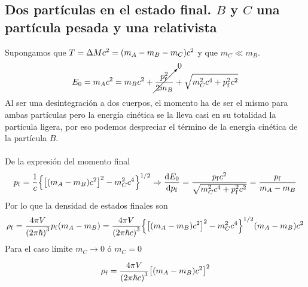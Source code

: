\subsection{Dos partículas en el estado final. $B$ y $C$ una partícula pesada y una relativista}
Supongamos que $T=\Delta M c^2=\qty(m_A-m_B-m_C)c^2$ y que $m_C\ll m_B$.
\begin{equation}
    E_0=m_Ac^2= m_Bc^2+\cancelto{0}{\frac{p_\mathrm{f}^2}{2m_B}}+\sqrt{m_C^2c^4+p_\mathrm{f}^2c^2}
\end{equation}
Al ser una desintegración a dos cuerpos, el momento ha de ser el mismo para ambas partículas pero la energía cinética se la lleva casi en su totalidad la partícula ligera, por eso podemos despreciar el término de la energía cinética de la partícula $B$.
\\\\
De la expresión del momento final
\begin{equation}
    p_\mathrm{f}=\frac{1}{c}\qty{\qty[(m_A-m_B)c^2]^2-m_C^2c^4}^{1/2} \Rightarrow \dv{E_0}{p_\mathrm{f}}=\frac{p_\mathrm{f}c^2}{\sqrt{m_C^2c^4+p_\mathrm{f}^2c^2}}=\frac{p_\mathrm{f}}{m_A-m_B}
\end{equation}
Por lo que la densidad de estados finales son 
\begin{equation}
    \rho_\mathrm{f}=\frac{4\pi V}{\qty(2\pi\hbar)^3}p_\mathrm{f}\qty(m_A-m_B)=\frac{4\pi V}{\qty(2\pi\hbar c)^3} \qty{\qty[(m_A-m_B)c^2]^2-m_C^2c^4}^{1/2} \qty(m_A-m_B)c^2
\end{equation}
Para el caso límite $m_C\xrightarrow[]{} 0$ ó $m_C=0$
\begin{equation}
    \rho_\mathrm{f}=\frac{4\pi V}{\qty(2\pi\hbar c)^3} \qty[\qty(m_A-m_B)c^2]^2
\end{equation}
